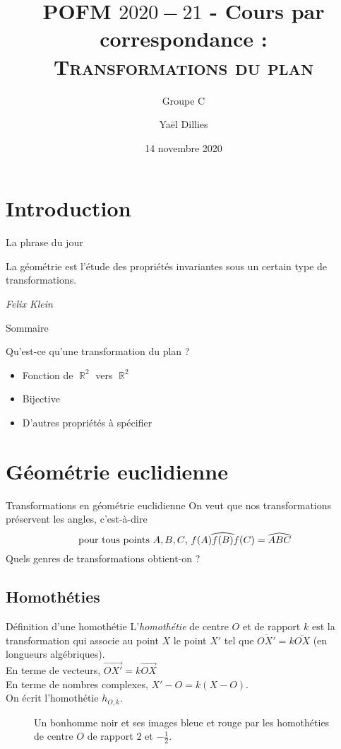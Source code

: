 \documentclass[french]{beamer}
\title{POFM $ 2020-21 $ - Cours par correspondance : \\ \textsc{Transformations du plan}}
\subtitle{Groupe C}
\author[Yaël Dillies]{Yaël Dillies}
\date{14 novembre 2020}
\DeclareMathOperator{\R}{\mathbb R}
\theoremstyle{plain}
\begin{document}
\section{Introduction}
\begin{frame}
  \titlepage
\end{frame}


\begin{frame}{La phrase du jour}
  \epigraph{La géométrie est l'étude des propriétés invariantes sous un certain type de transformations.}{\textit{Felix Klein}}
\end{frame}


\begin{frame}{Sommaire}
  \tableofcontents
\end{frame}


\begin{frame}{Qu'est-ce qu'une transformation du plan ?}
  \begin{itemize}
    \item Fonction de $ \R^2 $ vers $ \R^2 $
    \pause
    \item Bijective
    \pause
    \item D'autres propriétés à spécifier
  \end{itemize}
\end{frame}



\section{Géométrie euclidienne}
\begin{frame}{Transformations en géométrie euclidienne}
  On veut que nos transformations préservent les angles, c'est-à-dire
  $$ \text{ pour tous points $ A, B, C $, } \widehat{f(A)f(B)f(C)} = \widehat{ABC} $$
  Quels genres de transformations obtient-on ?
\end{frame}


\subsection{Homothéties}
\begin{frame}{Définition d'une homothétie}
  L'\textit{homothétie} de centre $ O $ et de rapport $ k $ est la transformation qui associe au point $ X $ le point $ X' $ tel que $ \overline{OX'} = k\overline{OX} $ (en longueurs algébriques). \\
  En terme de vecteurs, $ \overrightarrow{OX'} = k\overrightarrow{OX} $ \\
  En terme de nombres complexes, $ X' - O = k(X - O) $. \\
  On écrit l'homothétie $ h_{O, k} $.
  \begin{figure}
    \centering
    \caption{Un bonhomme noir et ses images bleue et rouge par les homothéties de centre $ O $ de rapport $ 2 $ et $ -\frac 12 $.}
  \end{figure}
\end{frame}
\end{document}
